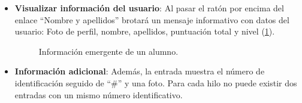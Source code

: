 \documentclass[a4paper, 12pt]{book}
\begin{document}
\begin{itemize}
  Si se presiona sobre el enlace del t\'itulo, se abrir\'a otra pesta\~na con la ubicaci\'on de la propia entrada dentro del blog. Y adem\'as, el bot\'on de
  entrada le\'ida se deshabilitar\'a (si no ha sido previamente pulsado).
  \item {\bfseries Visualizar informaci\'on del usuario}: Al pasar el rat\'on por encima del enlace ``Nombre y apellidos'' brotar\'a un mensaje informativo 
  con datos del usuario: Foto de perfil, nombre, apellidos, puntuaci\'on total y nivel (\ref{figura:hiloalumno2}).
  \begin{figure}[htbp] 
    \centering
    \caption{Informaci\'on emergente de un alumno.}
    \label{figura:hiloalumno2}
  \end{figure}
  
  \item {\bfseries Informaci\'on adicional}: Adem\'as, la entrada muestra el n\'umero de identificaci\'on seguido de ``\#'' y una foto. Para cada hilo no puede existir
  dos entradas con un mismo n\'umero identificativo.
\end{itemize}
\end{document}
